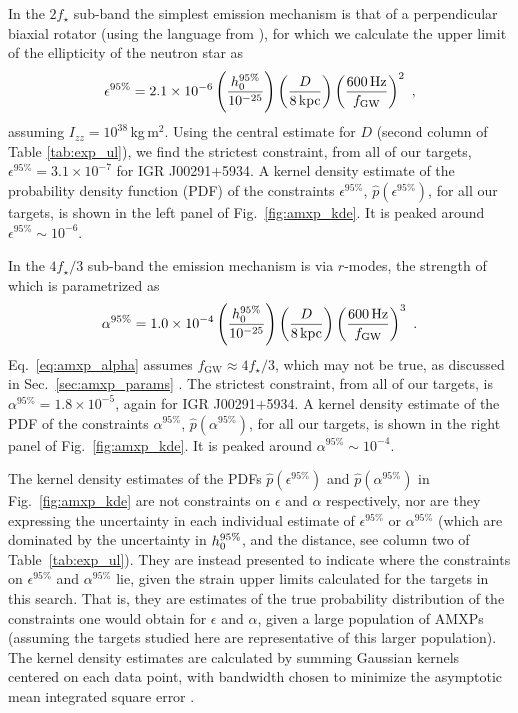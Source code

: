 In the $2f_\star$ sub-band the simplest emission mechanism is that of a perpendicular biaxial rotator (using the language from \citet{Sun2019}), for which we calculate the upper limit of the ellipticity of the neutron star as \cite{JKS98}
\begin{equation}
\epsilon^{95\%} = 2.1 \times 10^{-6} \left(\frac{h_0^{95\%}}{10^{-25}} \right) \left(\frac{D}{8\,\textrm{kpc}} \right) \left(\frac{600\,\textrm{Hz}}{f_{\textrm{GW}}} \right)^2\ , \label{eq:amxp_ellip}
\end{equation}
assuming $I_{zz} = 10^{38}\,$kg\,m$^2$. Using the central estimate for $D$ (second column of Table \ref{tab:exp_ul}), we find the strictest constraint, from all of our targets, $\epsilon^{95\%} = 3.1\times 10^{-7}$ for IGR J00291$+$5934. A kernel density estimate of the probability density function (PDF) of the constraints $\epsilon^{95\%}$, $\hat{p}(\epsilon^{95\%})$, for all our targets, is shown in the left panel of Fig.~\ref{fig:amxp_kde}. It is peaked around $\epsilon^{95\%} \sim 10^{-6}$. 

In the $4f_\star/3$ sub-band the emission mechanism is via $r$-modes, the strength of which is parametrized as \cite{Owen2010}
\begin{equation}
\alpha^{95\%} = 1.0\times10^{-4} \left(\frac{h_0^{95\%}}{10^{-25}} \right) \left(\frac{D}{8\,\textrm{kpc}} \right) \left(\frac{600\,\textrm{Hz}}{f_{\textrm{GW}}} \right)^3\ . \label{eq:amxp_alpha}
\end{equation}
Eq.~\eqref{eq:amxp_alpha} assumes $f_{\textrm{GW}} \approx 4f_\star/3$, which may not be true, as discussed in Sec.~\ref{sec:amxp_params} \cite{Idrisy2015, Caride2019}. The strictest constraint, from all of our targets, is $\alpha^{95\%} = 1.8\times 10^{-5}$, again for IGR J00291$+$5934. A kernel density estimate of the PDF of the constraints $\alpha^{95\%}$, $\hat{p}(\alpha^{95\%})$, for all our targets, is shown in the right panel of Fig.~\ref{fig:amxp_kde}. It is peaked around $\alpha^{95\%} \sim 10^{-4}$.

The kernel density estimates of the PDFs $\hat{p}(\epsilon^{95\%})$ and $\hat{p}(\alpha^{95\%})$ in Fig.~\ref{fig:amxp_kde} are not constraints on $\epsilon$ and $\alpha$ respectively, nor are they expressing the uncertainty in each individual estimate of $\epsilon^{95\%}$ or $\alpha^{95\%}$ (which are dominated by the uncertainty in $h_0^{95\%}$, and the distance, see column two of Table~\ref{tab:exp_ul}). They are instead presented to indicate where the constraints on $\epsilon^{95\%}$ and $\alpha^{95\%}$ lie, given the strain upper limits calculated for the targets in this search. That is, they are estimates of the true probability distribution of the constraints one would obtain for $\epsilon$ and $\alpha$, given a large population of AMXPs (assuming the targets studied here are representative of this larger population). The kernel density estimates are calculated by summing Gaussian kernels centered on each data point, with bandwidth chosen to minimize the asymptotic mean integrated square error \cite{Wand1995}.

